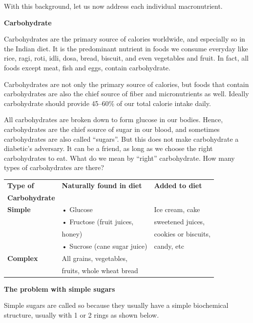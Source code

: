 With this background, let us now address each individual macronutrient.

\noindent\textbf{Carbohydrate}

Carbohydrates are the primary source of calories worldwide, and especially so in the Indian diet. It is the predominant nutrient in foods we consume everyday like rice, ragi, roti, idli, dosa, bread, biscuit, and even vegetables and fruit. In fact, all foods except meat, fish and eggs, contain carbohydrate.

Carbohydrates are not only the primary source of calories, but foods that contain carbohydrates are also the chief source of fiber and micronutrients as well. Ideally carbohydrate should provide 45–60\% of our total calorie intake daily.

All carbohydrates are broken down to form glucose in our bodies. Hence, carbohydrates are the chief source of sugar in our blood, and sometimes carbohydrates are also called “sugars”. But this does not make carbohydrate a diabetic’s adversary. It can be a friend, as long as we choose the right carbohydrates to eat. What do we mean by “right” carbohydrate. How many types of carbohydrates are there?

\begin{center}
\begin{tabular}{|l|l|l|}
\hline
\textbf{Type of} & \textbf{Naturally found in diet} & \textbf{Added to diet}\\
\textbf{Carbohydrate} & &\\
\hline
\textbf{Simple} & • Glucose & Ice cream, cake\\
\hline
 & • Fructose (fruit juices, & sweetened juices,\\
  & honey) & cookies or biscuits,\\
  & • Sucrose (cane sugar juice) & candy, etc\\
\hline
\textbf{Complex} & All grains, vegetables, &\\
 & fruits, whole wheat bread &\\
\hline
\end{tabular}
\end{center}

\noindent\textbf{The problem with simple sugars}

Simple sugars are called so because they usually have a simple biochemical structure, usually with 1 or 2 rings as shown below.

